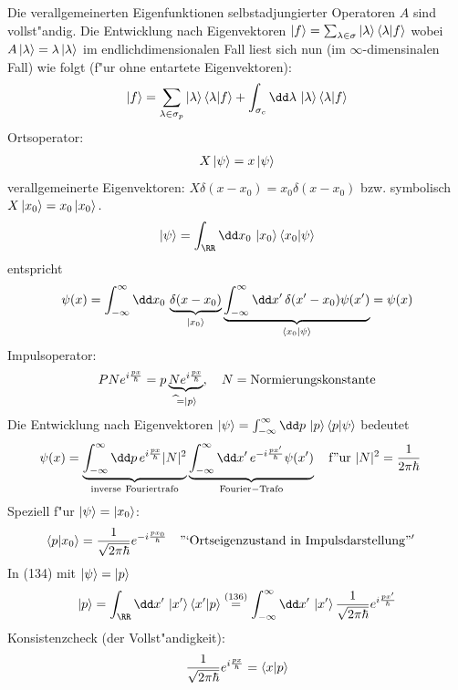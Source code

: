\documentclass[a4paper]{scrartcl}
\begin{document}
{Die verallgemeinerten Eigenfunktionen selbstadjungierter Operatoren $A$ sind vollst"andig. Die Entwicklung nach Eigenvektoren $ \ket{f} = \sum_{\lambda \in \sigma} \ket{\lambda} \braket{ \lambda | f }$ wobei $A \ket{\lambda} = \lambda \ket \lambda$ im endlichdimensionalen Fall liest sich nun (im $\infty$-dimensinalen Fall) wie folgt (f"ur ohne entartete Eigenvektoren):
\begin{align}
\ket f = \sum_{\lambda \in \sigma_p} \ket \lambda \braket{ \lambda | f} + \int_{\sigma_c} \dd \lambda \, \ket \lambda \braket{ \lambda | f}
\end{align}
Ortsoperator:
\begin{align} X \ket \psi = x \ket \psi \end{align}
verallgemeinerte Eigenvektoren: $X \delta(x-x_0) = x_0 \delta(x-x_0)$ bzw. symbolisch $X \ket{x_0} = x_0 \ket{x_0}.$
\begin{align}
\ket \psi = \int_\RR \dd x_0 \, \ket {x_0} \braket{ x_0 | \psi}
\end{align}
entspricht
$$ \psi(x) = \int_{-\infty}^\infty \dd x_0 \, \underbrace{ \delta(x-x_0) }_{\ket{x_0}} \underbrace{\int_{-\infty}^\infty \dd x' \, \delta(x' - x_0) \psi(x')}_{\braket{ x_0 | \psi}} = \psi(x)$$
Impulsoperator:
$$P  N e^{i \frac {px}{\hbar}} = p \underbrace{ N e^{i \frac{px} \hbar}}_{\widehat \, = \ket p}, \quad N    =  \mathrm{ Normierungskonstante}$$
Die Entwicklung nach Eigenvektoren $\ket \psi = \int_{-\infty}^\infty \dd p \, \ket p \braket{ p | \psi}$ bedeutet
\begin{align}
\psi(x) & = \underbrace{ \int_{-\infty}^\infty \dd p \, e^{i \frac {px}\hbar} \vert N \vert^2 }_{\mathrm{inverse \ Fouriertrafo}} \underbrace{ \int_{-\infty}^\infty \dd x' \,  e^{- i \frac{px'} \hbar} \psi(x') }_{\mathrm{Fourier-Trafo}} \quad \mathrm{f"ur \ } \vert N \vert ^2 = \frac 1 {2 \pi \hbar}
\end{align}
Speziell f"ur $\ket \psi = \ket {x_0}$:
\begin{align}
\braket {p | x_0} & = \frac1{\sqrt{2 \pi \hbar}} e^{- i \frac {p x_0}\hbar} \quad \mathrm{"`Ortseigenzustand \ in \ Impulsdarstellung"'}
\end{align}
In (134) mit $\ket \psi = \ket p$
$$ \ket p = \int_\RR \dd x' \, \ket {x'} \braket{ x' | p} \stackrel{(136)}= \int_{-\infty}^\infty \dd x' \, \ket{ x'} \frac1{\sqrt{2\pi\hbar}} e^{i \frac{px'}\hbar}$$
Konsistenzcheck (der Vollst"andigkeit):
\begin{align}
\begin{split}
\frac1{\sqrt{2\pi\hbar}} e^{i \frac{px}\hbar} & = \braket{ x | p } \\

\end{split}
\end{align}}
\end{document}

